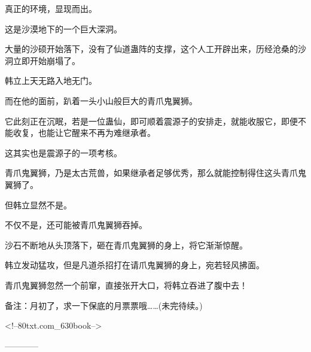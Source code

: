\begin{this_body}
真正的环境，显现而出。

这是沙漠地下的一个巨大深洞。

大量的沙硕开始落下，没有了仙道蛊阵的支撑，这个人工开辟出来，历经沧桑的沙洞立即开始崩塌了。

韩立上天无路入地无门。

而在他的面前，趴着一头小山般巨大的青爪鬼翼狮。

它此刻正在沉眠，若是一位蛊仙，即可顺着震源子的安排走，就能收服它，即便不能收复，也能让它醒来不再为难继承者。

这其实也是震源子的一项考核。

青爪鬼翼狮，乃是太古荒兽，如果继承者足够优秀，那么就能控制得住这头青爪鬼翼狮了。

但韩立显然不是。

不仅不是，还可能被青爪鬼翼狮吞掉。

沙石不断地从头顶落下，砸在青爪鬼翼狮的身上，将它渐渐惊醒。

韩立发动猛攻，但是凡道杀招打在请爪鬼翼狮的身上，宛若轻风拂面。

青爪鬼翼狮忽然一个前窜，直接张开大口，将韩立吞进了腹中去！

备注：月初了，求一下保底的月票票哦……(未完待续。)

<!--80txt.com\_630book-->

------------

\end{this_body}

